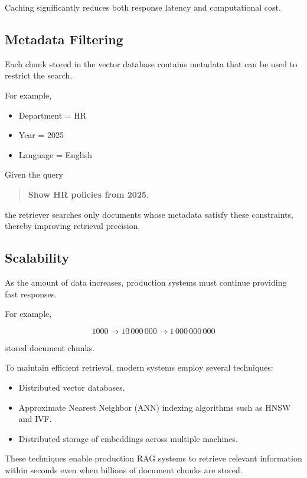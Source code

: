 Caching significantly reduces both response latency and computational cost.

\subsection*{Metadata Filtering}

Each chunk stored in the vector database contains metadata that can be used to restrict the search.

For example,

\begin{itemize}
    \item Department = HR
    \item Year = 2025
    \item Language = English
\end{itemize}

Given the query

\begin{quote}
\textbf{Show HR policies from 2025.}
\end{quote}

the retriever searches only documents whose metadata satisfy these constraints, thereby improving retrieval precision.

\subsection*{Scalability}

As the amount of data increases, production systems must continue providing fast responses.

For example,

\[
1000
\rightarrow
10\,000\,000
\rightarrow
1\,000\,000\,000
\]

stored document chunks.

To maintain efficient retrieval, modern systems employ several techniques:

\begin{itemize}
    \item Distributed vector databases.
    \item Approximate Nearest Neighbor (ANN) indexing algorithms such as HNSW and IVF.
    \item Distributed storage of embeddings across multiple machines.
\end{itemize}

These techniques enable production RAG systems to retrieve relevant information within seconds even when billions of document chunks are stored.

